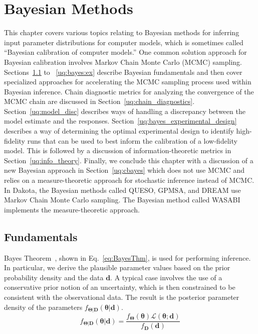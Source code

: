 \chapter{Bayesian Methods}\label{uq:bayes}


This chapter covers various topics relating to Bayesian methods for inferring input parameter distributions 
for computer models, which is sometimes called ``Bayesian calibration 
of computer models.''  One common solution approach for Bayesian calibration involves Markov Chain Monte Carlo (MCMC) 
sampling.  Sections~\ref{uq:bayes:basic} to ~\ref{uq:bayes:ex} describe Bayesian fundamentals and then cover 
specialized approaches for accelerating the MCMC sampling process used within Bayesian inference.
Chain diagnostic metrics for analyzing the convergence of the MCMC chain are
discussed in Section~\ref{uq:chain_diagnostics}.
Section~\ref{uq:model_disc} describes ways of handling a discrepancy between the model estimate and the responses. 
Section~\ref{uq:bayes_experimental_design} describes a way of determining the optimal experimental design to
identify high-fidelity runs that can be used to best inform the calibration of a low-fidelity model. 
This is followed by a discussion of information-theoretic metrics in Section~\ref{uq:info_theory}.  
Finally, we conclude this chapter with a discussion of a new Bayesian approach in Section~\ref{uq:cbayes} 
which does not use MCMC and relies on a measure-theoretic approach for stochastic inference instead of MCMC.
In Dakota, the Bayesian methods called QUESO, GPMSA, and DREAM use Markov Chain Monte Carlo sampling. 
The Bayesian method called WASABI implements the measure-theoretic approach. 

\section{Fundamentals} \label{uq:bayes:basic}

Bayes Theorem~\cite{Jaynes}, shown in Eq.~\ref{eq:BayesThm}, is used
for performing inference.  In particular, we derive the plausible
parameter values based on the prior probability density and the data
$\boldsymbol{d}$. A typical case involves the use of a conservative prior notion of
an uncertainty, which is then constrained to be consistent with the
observational data.  The result is the posterior parameter density of
the parameters $f_{\boldsymbol{\Theta |D}}\left( \boldsymbol{\theta |d} \right)$.
\begin{equation}
{f_{\boldsymbol{\Theta |D}}}\left( \boldsymbol{\theta |d} \right) = \frac{{{f_{\boldsymbol{\Theta}}}\left( \boldsymbol{\theta}  \right)\mathcal{L}\left( \boldsymbol{\theta;d} \right)}}{{{f_{\boldsymbol{D}}}\left( \boldsymbol{d} \right)}} \label{eq:BayesThm}
\end{equation}

